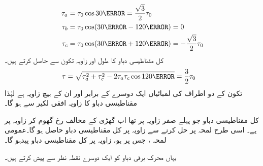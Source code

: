 %
\begin{gather}
\begin{aligned}
\tau_a&=\tau_0 \cos 30\degree=\frac{\sqrt{3}}{2} \tau_0\\
\tau_b&=\tau_0 \cos (30\degree-120\degree)=0\\
\tau_c&=\tau_0 \cos (30\degree+120\degree)=-\frac{\sqrt{3}}{2} \tau_0
\end{aligned}
\end{gather}
%
کل مقناطیسی دباو کا طول   اور زاویہ تکون  سے حاصل کرتے ہیں۔
\begin{align}
\tau&=\sqrt{\tau_a^2+\tau_c^2-2 \tau_a \tau_c \cos 120\degree}=\frac{3}{2}\tau_0
\end{align}
تکون کے دو اطراف کی لمبائیاں ایک دوسرے کے برابر  اور ان کے بیچ زاویہ  ہے  لہٰذا مقناطیسی دباو کا زاویہ افقی لکیر سے   ہو گا۔

کل مقناطیسی دباو جو پہلے صفر زاویہ پر تھا اب  گھڑی کے مخالف رخ گھوم کر   زاویہ پر ہے۔ اسی طرح لمحہ   پر حل کرنے سے   زاویہ      پر کل مقناطیسی دباو    حاصل ہو گا۔عمومی لمحہ ، جس پر    ہو، زاویہ   پر  کل مقناطیسی دباو    پیدہو گا۔

یہاں محرک برقی دباو کو  ایک دوسرے نقطہ نظر سے پیش کرتے ہیں۔

